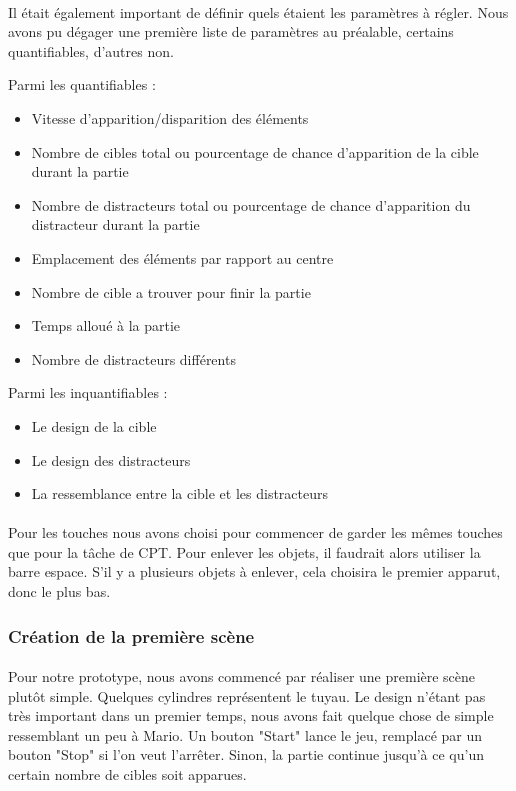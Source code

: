 \paragraph{}Il était également important de définir quels étaient les paramètres à régler. Nous avons pu dégager une première liste de paramètres au préalable, certains
quantifiables, d'autres non.

Parmi les quantifiables :
\begin{itemize}
    \item Vitesse d'apparition/disparition des éléments
    \item Nombre de cibles total ou pourcentage de chance d'apparition de la cible durant la partie
    \item Nombre de distracteurs total ou pourcentage de chance d'apparition du distracteur durant la partie
    \item Emplacement des éléments par rapport au centre
    \item Nombre de cible a trouver pour finir la partie
    \item Temps alloué à la partie
    \item Nombre de distracteurs différents\\
\end{itemize}
Parmi les inquantifiables :
\begin{itemize}
    \item Le design de la cible
    \item Le design des distracteurs
    \item La ressemblance entre la cible et les distracteurs
\end{itemize}

\paragraph{}Pour les touches nous avons choisi pour commencer de garder les mêmes touches que pour la tâche de CPT. Pour enlever les objets, il faudrait alors utiliser la barre espace.
S'il y a plusieurs objets à enlever, cela choisira le premier apparut, donc le plus bas.

\subsubsection{Création de la première scène}

\paragraph{}Pour notre prototype, nous avons commencé par réaliser une première scène plutôt simple. Quelques cylindres représentent le tuyau. Le design n'étant pas très important
dans un premier temps, nous avons fait quelque chose de simple ressemblant un peu à Mario. Un bouton "Start" lance le jeu, remplacé par un bouton "Stop" si l'on veut l'arrêter. Sinon,
la partie continue jusqu'à ce qu'un certain nombre de cibles soit apparues. \\

